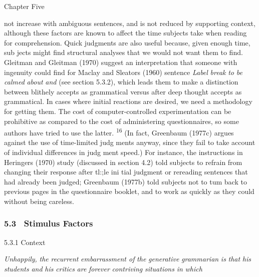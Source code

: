 \clearpage\setcounter{page}{1}\begin{styleStandard}
Chapter Five
\end{styleStandard}


\begin{styleTextbody}
not increase with ambiguous sentences, and is not reduced by supporting context, although these factors are known to affect the time subjects take when reading for comprehension. Quick judgments are also useful because, given enough time, sub\- jects might find structural analyses that we would not want them to find. Gleitman and Gleitman (1970) suggest an interpretation that someone with ingenuity could find for Maclay and Sleator{\textquotesingle}s (1960) sentence \textit{Label}\textit{ }\textit{break}\textit{ }\textit{to}\textit{ }\textit{be}\textit{ }\textit{calmed}\textit{ }\textit{about}\textit{ }\textit{and}\textit{ }(see section 5.3.2), which leads them to make a distinction between {\textquotedbl}blithely accepts as grammatical{\textquotedbl} versus {\textquotedbl}after deep thought accepts as grammatical.{\textquotedbl} In cases where initial reactions are desired, we need a methodology for getting them. The cost of computer-controlled experimentation can be prohibitive as compared to the cost of administering questionnaires, so some authors have tried to use the latter. \textsuperscript{16}\textsuperscript{ }(In fact, Greenbaum (1977c) argues against the use of time-limited judg\- ments anyway, since they fail to take account of individual differences in judg ment speed.) For instance, the instructions in Heringer{\textquotesingle}s (1970) study (discussed in section 4.2) told subjects to refrain from changing their response after tl:;le ini\- tial judgment or rereading sentences that had already been judged; Greenbaum (1977b) told subjects not to tum back to previous pages in the questionnaire booklet, and to work as quickly as they could without being careless.
\end{styleTextbody}


\subsubsection[5.3 \ Stimulus Factors]{5.3 \ Stimulus Factors}
\begin{styleHeadingviii}
5.3.1 Context
\end{styleHeadingviii}


\begin{styleStandard}
\textit{Unhappily,}\textit{ }\textit{the}\textit{ }\textit{recurrent}\textit{ }\textit{embarrassment of}\textit{ }\textit{the}\textit{ }\textit{generative}\textit{ }\textit{grammarian}\textit{ }\textit{is}\textit{ }\textit{that}\textit{ }\textit{his}\textit{ }\textit{students}\textit{ }\textit{and}\textit{ }\textit{his}\textit{ }\textit{critics}\textit{ }\textit{are}\textit{ }\textit{forever}\textit{ }\textit{contriving}\textit{ }\textit{situations}\textit{ }\textit{in}\textit{ }\textit{which}
\end{styleStandard}


